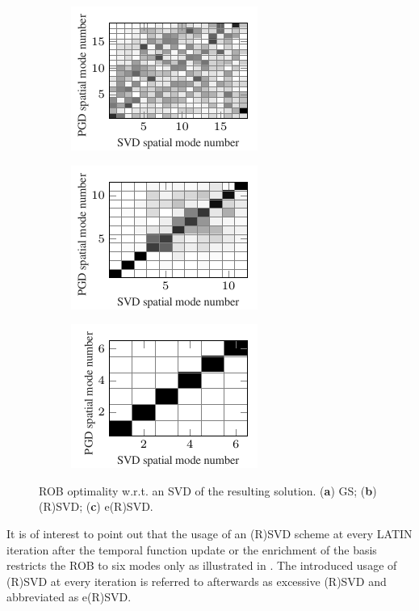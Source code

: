 \begin{figure}[hbt!]
	\centering
	\begin{subfigure}[t]{0.31\linewidth}
		\includegraphics{./figures/modal_optimisation/gs_optimality}
		\caption{}
	\end{subfigure}
	\hfil
	\begin{subfigure}[t]{0.31\linewidth}
		\includegraphics{./figures/modal_optimisation/svd_optimality}
		\caption{}
		\label{fig_svd_optimality}
	\end{subfigure}
	\hfil
	\begin{subfigure}[t]{0.31\linewidth}
		\includegraphics{./figures/modal_optimisation/svd_update_optimality}
		\caption{}
		\label{fig_svd_update_optimality}
	\end{subfigure}
	\caption{ROB optimality w.r.t. an SVD of the resulting solution. (\textbf{a}) GS; (\textbf{b}) (R)SVD; (\textbf{c}) e(R)SVD.}
	\label{fig_modes_optimality}
\end{figure}

It is of interest to point out that the usage of an (R)SVD scheme at every LATIN iteration after the temporal function update or the enrichment of the basis restricts the ROB to six modes only as illustrated {in} . The introduced usage of (R)SVD at every iteration is referred to afterwards as excessive (R)SVD and abbreviated as e(R)SVD.

